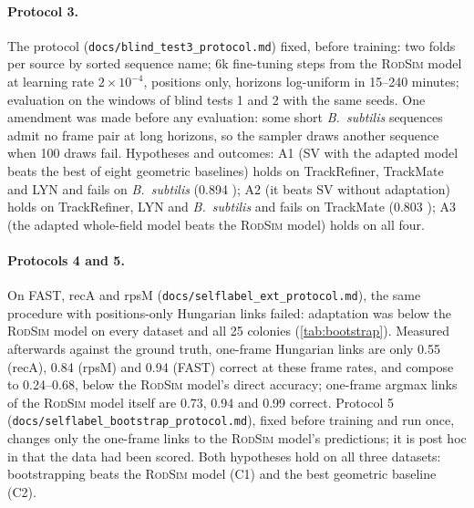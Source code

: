 \documentclass[10pt,twocolumn,letterpaper]{article}
\newcommand{\rodsim}{\textsc{RodSim}\xspace}
\begin{document}
\paragraph{Protocol 3.}
The protocol (\texttt{docs/blind\_test3\_protocol.md}) fixed, before training: two folds per source by sorted sequence name; 6k fine-tuning steps from the \rodsim model at learning rate $2{\times}10^{-4}$, positions only, horizons log-uniform in 15--240 minutes; evaluation on the windows of blind tests 1 and 2 with the same seeds.
One amendment was made before any evaluation: some short \emph{B.\ subtilis} sequences admit no frame pair at long horizons, so the sampler draws another sequence when 100 draws fail.
Hypotheses and outcomes:
A1 (SV with the adapted model beats the best of eight geometric baselines) holds on TrackRefiner, TrackMate and LYN and fails on \emph{B.\ subtilis} (0.894 );
A2 (it beats SV without adaptation) holds on TrackRefiner, LYN and \emph{B.\ subtilis} and fails on TrackMate (0.803 );
A3 (the adapted whole-field model beats the \rodsim model) holds on all four.

\paragraph{Protocols 4 and 5.}
On FAST, recA and rpsM (\texttt{docs/selflabel\_ext\_protocol.md}), the same procedure with positions-only Hungarian links failed: adaptation was below the \rodsim model on every dataset and all 25 colonies (\cref{tab:bootstrap}).
Measured afterwards against the ground truth, one-frame Hungarian links are only 0.55 (recA), 0.84 (rpsM) and 0.94 (FAST) correct at these frame rates, and compose to 0.24--0.68, below the \rodsim model's direct accuracy; one-frame argmax links of the \rodsim model itself are 0.73, 0.94 and 0.99 correct.
Protocol 5 (\texttt{docs/selflabel\_bootstrap\_protocol.md}), fixed before training and run once, changes only the one-frame links to the \rodsim model's predictions; it is post hoc in that the data had been scored.
Both hypotheses hold on all three datasets: bootstrapping beats the \rodsim model (C1) and the best geometric baseline (C2).

\end{document}

